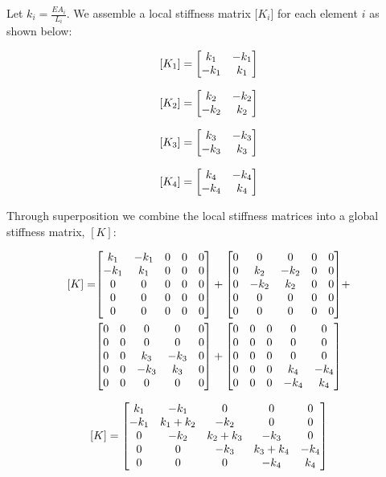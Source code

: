 \documentclass[../main.tex]{subfiles}
\begin{document}
\newpage


Let \(k_i = \frac{EA_i}{L_i}\).
We assemble a local stiffness matrix \([K_i\)] for each element \(i\) as shown below:

\[
    [K_1] = \mqty[k_1 & -k_1\\ -k_1 & k_1]
\]

\[
    [K_2] = \mqty[k_2 & -k_2\\ -k_2 & k_2]
\]

\[
    [K_3] = \mqty[k_3 & -k_3\\ -k_3 & k_3]
\]

\[
    [K_4] = \mqty[k_4 & -k_4\\ -k_4 & k_4]
\]

Through superposition we combine the local stiffness matrices into a global stiffness matrix, \([K]\):

\[
    \begin{aligned}
    [K] = 
    &
    \mqty[
        k_1 & -k_1 & 0 & 0 & 0\\
        -k_1 & k_1 & 0 & 0 & 0\\
        0 & 0 & 0 & 0 & 0 \\
        0 & 0 & 0 & 0 & 0 \\
        0 & 0 & 0 & 0 & 0
    ]
    +
    \mqty[
        0 & 0 & 0 & 0 & 0\\
        0 & k_2 & -k_2 & 0 & 0\\
        0 & -k_2 & k_2 & 0 & 0 \\
        0 & 0 & 0 & 0 & 0 \\
        0 & 0 & 0 & 0 & 0
    ]
    +  \\
    &
    \mqty[
        0 & 0 & 0 & 0 & 0\\
        0 & 0 & 0 & 0 & 0\\
        0 & 0 & k_3 & -k_3 & 0 \\
        0 & 0 & -k_3 & k_3 & 0 \\
        0 & 0 & 0 & 0 & 0
    ]
    +
    \mqty[
        0 & 0 & 0 & 0 & 0\\
        0 & 0 & 0 & 0 & 0\\
        0 & 0 & 0 & 0 & 0 \\
        0 & 0 & 0 & k_4 & -k_4 \\
        0 & 0 & 0 & -k_4 & k_4
    ]
    \end{aligned}
\]

\[
    [K] =
    \mqty[
        k_1 & -k_1 & 0 & 0 & 0\\
        -k_1 & k_1+k_2 & -k_2 & 0 & 0\\
        0 & -k_2 & k_2+k_3 & -k_3 & 0 \\
        0 & 0 & -k_3 &k_3 + k_4 & -k_4 \\
        0 & 0 & 0 & -k_4 & k_4
    ]
\]
\end{document}
